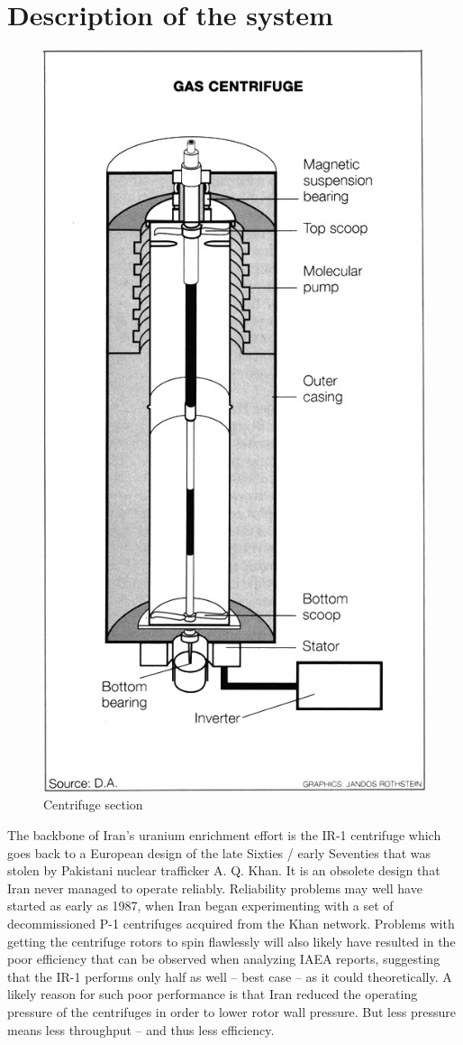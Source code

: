\documentclass[12pt]{article}
\begin{document}
\section{Description of the system}
    \begin{figure}
    \centering
    \includegraphics[height=0.65\textwidth]{figures/centrifugeAlternative.jpg}
    \caption{Centrifuge section}
    \label{fig:centrifuge1}
    \end{figure}
The backbone of Iran’s uranium enrichment effort is the IR-1 centrifuge which goes back to a European design of the late Sixties / early Seventies that was stolen by Pakistani nuclear trafficker A. Q. Khan. It is an obsolete design that Iran never managed to operate reliably. Reliability problems may well have started as early as 1987, when Iran began experimenting with a set of decommissioned P-1 centrifuges acquired from the Khan network. Problems with getting the centrifuge rotors to spin flawlessly will also likely have resulted in the poor
efficiency that can be observed when analyzing IAEA reports, suggesting that the IR-1 performs only half as well – best case – as it could theoretically. A likely reason for such poor performance is that Iran reduced the operating pressure of the centrifuges in order to lower rotor wall pressure. But less pressure means less throughput – and thus less efficiency.
\end{document}
